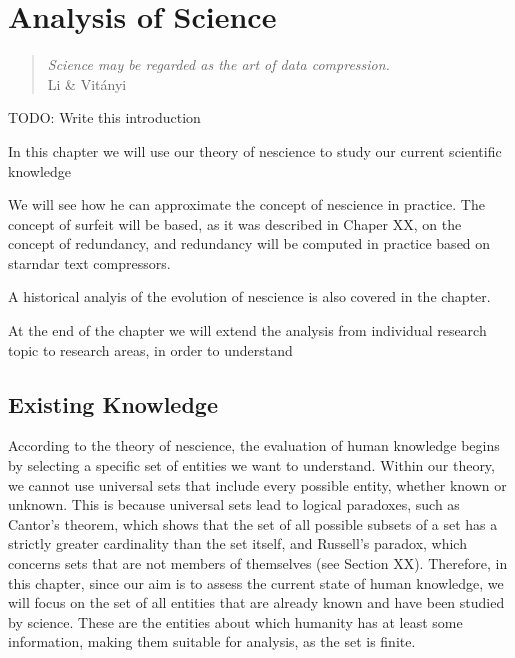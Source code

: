 %
%


\chapter{Analysis of Science}
\label{chap:philosophy-science}

\begin{quote}
\begin{flushright}
\emph{Science may be regarded as the art of data compression.}\\
Li \& Vitányi
\end{flushright}
\end{quote}
\bigskip

{\color{red} TODO: Write this introduction}

In this chapter we will use our theory of nescience to study our current scientific knowledge

We will see how he can approximate the concept of nescience in practice. The concept of surfeit will be based, as it was described in Chaper XX, on the concept of redundancy, and redundancy will be computed in practice based on starndar text compressors.

A historical analyis of the evolution of nescience is also covered in the chapter.

At the end of the chapter we will extend the analysis from individual research topic to research areas, in order to understand 

%
%
\section{Existing Knowledge}

According to the theory of nescience, the evaluation of human knowledge begins by selecting a specific set of entities we want to understand. Within our theory, we cannot use universal sets that include every possible entity, whether known or unknown. This is because universal sets lead to logical paradoxes, such as Cantor's theorem, which shows that the set of all possible subsets of a set has a strictly greater cardinality than the set itself, and Russell's paradox, which concerns sets that are not members of themselves (see Section XX). Therefore, in this chapter, since our aim is to assess the current state of human knowledge, we will focus on the set of all entities that are already known and have been studied by science. These are the entities about which humanity has at least some information, making them suitable for analysis, as the set is finite.

